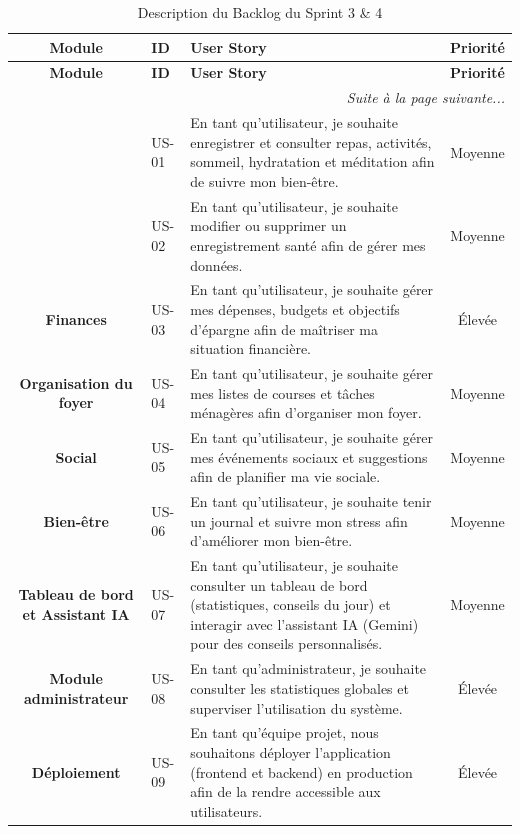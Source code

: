 \vspace{0.4cm}
\begin{longtable}{|c|l|l|c|}
\caption{Description du Backlog du Sprint 3 \& 4} \label{backlog2}
\\
\hline
\textbf{Module} &
\textbf{ID} &
\textbf{User Story} &
\textbf{Priorité} \\
\hline
\endfirsthead

\hline
\textbf{Module} &
\textbf{ID} &
\textbf{User Story} &
\textbf{Priorité} \\
\hline
\endhead

\hline
\multicolumn{4}{r|}{\textit{Suite à la page suivante...}} \\
\endfoot

\hline
\endlastfoot

\multirow{4}{*}{\textbf{Suivi santé}} &
US-01 &
En tant qu'utilisateur, je souhaite enregistrer et consulter repas, activités, sommeil, hydratation et méditation afin de suivre mon bien-être. &
Moyenne \\
\cline{2-4}
&
US-02 &
En tant qu'utilisateur, je souhaite modifier ou supprimer un enregistrement santé afin de gérer mes données. &
Moyenne \\
\cline{1-4}

\multirow{1}{*}{\textbf{Finances}} &
US-03 &
En tant qu'utilisateur, je souhaite gérer mes dépenses, budgets et objectifs d'épargne afin de maîtriser ma situation financière. &
Élevée \\
\cline{1-4}

\multirow{1}{*}{\textbf{Organisation du foyer}} &
US-04 &
En tant qu'utilisateur, je souhaite gérer mes listes de courses et tâches ménagères afin d'organiser mon foyer. &
Moyenne \\
\cline{1-4}

\multirow{1}{*}{\textbf{Social}} &
US-05 &
En tant qu'utilisateur, je souhaite gérer mes événements sociaux et suggestions afin de planifier ma vie sociale. &
Moyenne \\
\cline{1-4}

\multirow{1}{*}{\textbf{Bien-être}} &
US-06 &
En tant qu'utilisateur, je souhaite tenir un journal et suivre mon stress afin d'améliorer mon bien-être. &
Moyenne \\
\cline{1-4}

\multirow{1}{*}{\textbf{Tableau de bord et Assistant IA}} &
US-07 &
En tant qu'utilisateur, je souhaite consulter un tableau de bord (statistiques, conseils du jour) et interagir avec l'assistant IA (Gemini) pour des conseils personnalisés. &
Moyenne \\
\cline{1-4}

\multirow{1}{*}{\textbf{Module administrateur}} &
US-08 &
En tant qu'administrateur, je souhaite consulter les statistiques globales et superviser l'utilisation du système. &
Élevée \\
\cline{1-4}

\multirow{1}{*}{\textbf{Déploiement}} &
US-09 &
En tant qu'équipe projet, nous souhaitons déployer l'application (frontend et backend) en production afin de la rendre accessible aux utilisateurs. &
Élevée \\
\cline{1-4}

\end{longtable}

